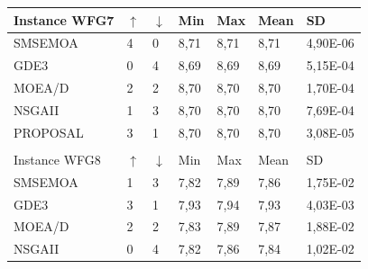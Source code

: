 \begin{table}[H]
\begin{scriptsize}
{\begin{tabular}{lllllll}
 \multicolumn{1}{|l|}{Instance WFG7} & \multicolumn{1}{l|}{$\uparrow$} & \multicolumn{1}{l|}{$\downarrow$} & \multicolumn{1}{l|}{Min} & \multicolumn{1}{l|}{Max} & \multicolumn{1}{l|}{Mean} & \multicolumn{1}{l|}{SD} \\ \hline
 \multicolumn{1}{|l|}{SMSEMOA} & \multicolumn{1}{l|}{4} & \multicolumn{1}{l|}{0} & \multicolumn{1}{l|}{8,71} & \multicolumn{1}{l|}{8,71} & \multicolumn{1}{l|}{8,71} & \multicolumn{1}{l|}{4,90E-06} \\ \hline
 \multicolumn{1}{|l|}{GDE3} & \multicolumn{1}{l|}{0} & \multicolumn{1}{l|}{4} & \multicolumn{1}{l|}{8,69} & \multicolumn{1}{l|}{8,69} & \multicolumn{1}{l|}{8,69} & \multicolumn{1}{l|}{5,15E-04} \\ \hline
 \multicolumn{1}{|l|}{MOEA/D} & \multicolumn{1}{l|}{2} & \multicolumn{1}{l|}{2} & \multicolumn{1}{l|}{8,70} & \multicolumn{1}{l|}{8,70} & \multicolumn{1}{l|}{8,70} & \multicolumn{1}{l|}{1,70E-04} \\ \hline
 \multicolumn{1}{|l|}{NSGAII} & \multicolumn{1}{l|}{1} & \multicolumn{1}{l|}{3} & \multicolumn{1}{l|}{8,70} & \multicolumn{1}{l|}{8,70} & \multicolumn{1}{l|}{8,70} & \multicolumn{1}{l|}{7,69E-04} \\ \hline
 \multicolumn{1}{|l|}{PROPOSAL} & \multicolumn{1}{l|}{3} & \multicolumn{1}{l|}{1} & \multicolumn{1}{l|}{8,70} & \multicolumn{1}{l|}{8,70} & \multicolumn{1}{l|}{8,70} & \multicolumn{1}{l|}{3,08E-05} \\ \hline
 &  &  &  &  &  &  \\ \hline
 \multicolumn{1}{|l|}{Instance WFG8} & \multicolumn{1}{l|}{$\uparrow$} & \multicolumn{1}{l|}{$\downarrow$} & \multicolumn{1}{l|}{Min} & \multicolumn{1}{l|}{Max} & \multicolumn{1}{l|}{Mean} & \multicolumn{1}{l|}{SD} \\ \hline
 \multicolumn{1}{|l|}{SMSEMOA} & \multicolumn{1}{l|}{1} & \multicolumn{1}{l|}{3} & \multicolumn{1}{l|}{7,82} & \multicolumn{1}{l|}{7,89} & \multicolumn{1}{l|}{7,86} & \multicolumn{1}{l|}{1,75E-02} \\ \hline
 \multicolumn{1}{|l|}{GDE3} & \multicolumn{1}{l|}{3} & \multicolumn{1}{l|}{1} & \multicolumn{1}{l|}{7,93} & \multicolumn{1}{l|}{7,94} & \multicolumn{1}{l|}{7,93} & \multicolumn{1}{l|}{4,03E-03} \\ \hline
 \multicolumn{1}{|l|}{MOEA/D} & \multicolumn{1}{l|}{2} & \multicolumn{1}{l|}{2} & \multicolumn{1}{l|}{7,83} & \multicolumn{1}{l|}{7,89} & \multicolumn{1}{l|}{7,87} & \multicolumn{1}{l|}{1,88E-02} \\ \hline
 \multicolumn{1}{|l|}{NSGAII} & \multicolumn{1}{l|}{0} & \multicolumn{1}{l|}{4} & \multicolumn{1}{l|}{7,82} & \multicolumn{1}{l|}{7,86} & \multicolumn{1}{l|}{7,84} & \multicolumn{1}{l|}{1,02E-02} \\ \hline

\end{tabular}}
\end{scriptsize}
\end{table}
